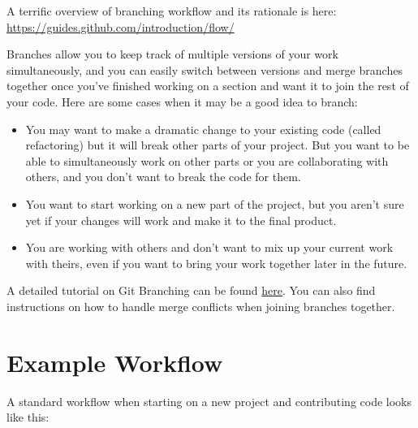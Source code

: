 \documentclass[
]{book}
\providecommand{\tightlist}{%
  \setlength{\itemsep}{0pt}\setlength{\parskip}{0pt}}
\begin{document}
A terrific overview of branching workflow and its rationale is here: \url{https://guides.github.com/introduction/flow/}

Branches allow you to keep track of multiple versions of your work simultaneously, and you can easily switch between versions and merge branches together once you've finished working on a section and want it to join the rest of your code. Here are some cases when it may be a good idea to branch:

\begin{itemize}
\tightlist
\item
  You may want to make a dramatic change to your existing code (called refactoring) but it will break other parts of your project. But you want to be able to simultaneously work on other parts or you are collaborating with others, and you don't want to break the code for them.
\item
  You want to start working on a new part of the project, but you aren't sure yet if your changes will work and make it to the final product.
\item
  You are working with others and don't want to mix up your current work with theirs, even if you want to bring your work together later in the future.
\end{itemize}

A detailed tutorial on Git Branching can be found \href{https://sp19.datastructur.es/materials/guides/using-git\#e-git-branching-advanced-git-optional}{here}. You can also find instructions on how to handle merge conflicts when joining branches together.

\hypertarget{example-workflow}{%
\section{Example Workflow}\label{example-workflow}}

A standard workflow when starting on a new project and contributing code looks like this:
\end{document}
